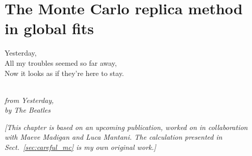 \documentclass[withindex,glossary]{cam-thesis}
\begin{document}
%

















\newpage
\chapter{The Monte Carlo replica method in global fits}
\label{chap:montecarlo}

\epigraph{Yesterday, \\ All my troubles seemed so far away, \\ Now it looks as if they're here to stay.}{\textit{\\ from Yesterday, \\ by The Beatles}}

\noindent \textit{[This chapter is based on an upcoming publication, worked on in collaboration with Maeve Madigan and Luca Mantani. The calculation presented in Sect.~\ref{sec:careful_mc} is my own original work.]}\\
\end{document}
